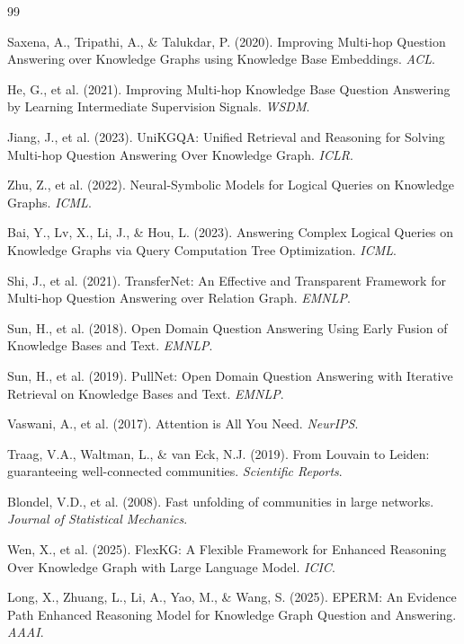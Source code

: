 \documentclass[10pt,twocolumn]{article}
\begin{document}

\begin{thebibliography}{99}

Saxena, A., Tripathi, A., \& Talukdar, P. (2020).
Improving Multi-hop Question Answering over Knowledge Graphs using Knowledge Base Embeddings.
\emph{ACL}.

He, G., et al. (2021).
Improving Multi-hop Knowledge Base Question Answering by Learning Intermediate Supervision Signals.
\emph{WSDM}.

Jiang, J., et al. (2023).
UniKGQA: Unified Retrieval and Reasoning for Solving Multi-hop Question Answering Over Knowledge Graph.
\emph{ICLR}.

Zhu, Z., et al. (2022).
Neural-Symbolic Models for Logical Queries on Knowledge Graphs.
\emph{ICML}.

Bai, Y., Lv, X., Li, J., \& Hou, L. (2023).
Answering Complex Logical Queries on Knowledge Graphs via Query Computation Tree Optimization.
\emph{ICML}.

Shi, J., et al. (2021).
TransferNet: An Effective and Transparent Framework for Multi-hop Question Answering over Relation Graph.
\emph{EMNLP}.

Sun, H., et al. (2018).
Open Domain Question Answering Using Early Fusion of Knowledge Bases and Text.
\emph{EMNLP}.

Sun, H., et al. (2019).
PullNet: Open Domain Question Answering with Iterative Retrieval on Knowledge Bases and Text.
\emph{EMNLP}.

Vaswani, A., et al. (2017).
Attention is All You Need.
\emph{NeurIPS}.

Traag, V.A., Waltman, L., \& van Eck, N.J. (2019).
From Louvain to Leiden: guaranteeing well-connected communities.
\emph{Scientific Reports}.

Blondel, V.D., et al. (2008).
Fast unfolding of communities in large networks.
\emph{Journal of Statistical Mechanics}.

Wen, X., et al. (2025).
FlexKG: A Flexible Framework for Enhanced Reasoning Over Knowledge Graph with Large Language Model.
\emph{ICIC}.

Long, X., Zhuang, L., Li, A., Yao, M., \& Wang, S. (2025).
EPERM: An Evidence Path Enhanced Reasoning Model for Knowledge Graph Question and Answering.
\emph{AAAI}.


\end{thebibliography}
\end{document}
